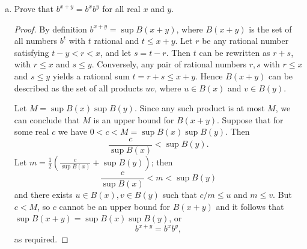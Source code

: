 \documentclass{article}
\begin{document}
\begin{enumerate}[(a)]
  \item Prove that $b^{x+y} = b^xb^y$ for all real $x$ and $y$.
    \begin{proof}
      By definition $b^{x+y} = \sup B(x + y)$, where $B(x + y)$ is the set of
      all numbers $b^t$ with $t$ rational and $t \leq x + y$. Let $r$ be any
      rational number satisfying $t - y < r < x$, and let $s = t - r$. Then $t$
      can be rewritten as $r + s$, with $r \leq x$ and $s \leq y$. Conversely,
      any pair of rational numbers $r, s$ with $r \leq x$ and $s \leq y$ yields
      a rational sum $t = r + s \leq x + y$. Hence $B(x + y)$ can be described
      as the set of all products $uv$, where $u \in B(x)$ and $v \in B(y)$.

      Let $M = \sup B(x)\sup B(y)$. Since any such product is at most $M$, we
      can conclude that $M$ is an upper bound for $B(x + y)$. Suppose that for
      some real $c$ we have $0 < c < M = \sup B(x)\sup B(y)$. Then \[
        \frac{c}{\sup B(x)} < \sup B(y).
      \] Let $m = \frac{1}{2}\left(\frac{c}{\sup B(x)} + \sup B(y)\right)$; then
      \[
        \frac{c}{\sup B(x)} < m < \sup B(y)
      \] and there exists $u \in B(x), v \in B(y)$ such that $c/m \leq u$ and $m
      \leq v$. But $c < M$, so $c$ cannot be an upper bound for $B(x + y)$ and
      it follows that $\sup B(x + y) = \sup B(x)\sup B(y)$, or \[
        b^{x+y} = b^xb^y,
      \] as required.
    \end{proof}
\end{enumerate}
\end{document}
